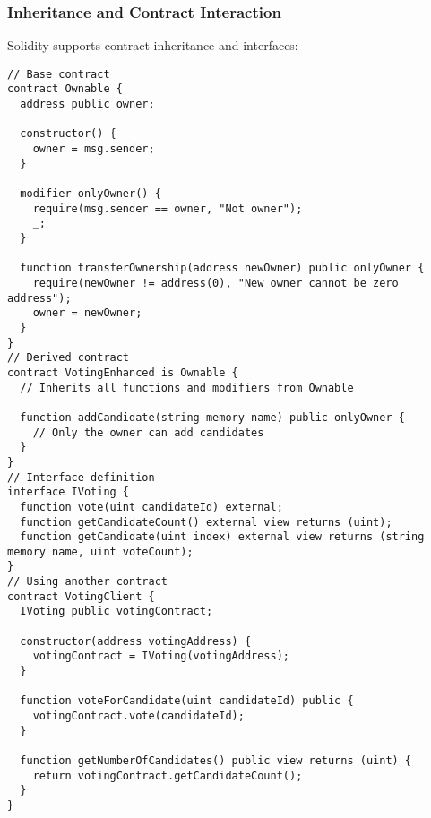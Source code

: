 \documentclass[12pt]{article}
\begin{document}
\noindent
\begin{minipage}[c]{\textwidth}
\subsubsection*{Inheritance and Contract Interaction}
Solidity supports contract inheritance and interfaces:

\begin{lstlisting}[language=Solidity]
// Base contract
contract Ownable {
  address public owner;

  constructor() {
    owner = msg.sender;
  }

  modifier onlyOwner() {
    require(msg.sender == owner, "Not owner");
    _;
  }

  function transferOwnership(address newOwner) public onlyOwner {
    require(newOwner != address(0), "New owner cannot be zero address");
    owner = newOwner;
  }
}
// Derived contract
contract VotingEnhanced is Ownable {
  // Inherits all functions and modifiers from Ownable
  
  function addCandidate(string memory name) public onlyOwner {
    // Only the owner can add candidates
  }
}
// Interface definition
interface IVoting {
  function vote(uint candidateId) external;
  function getCandidateCount() external view returns (uint);
  function getCandidate(uint index) external view returns (string memory name, uint voteCount);
}
// Using another contract
contract VotingClient {
  IVoting public votingContract;
  
  constructor(address votingAddress) {
    votingContract = IVoting(votingAddress);
  }

  function voteForCandidate(uint candidateId) public {
    votingContract.vote(candidateId);
  }

  function getNumberOfCandidates() public view returns (uint) {
    return votingContract.getCandidateCount();
  }
}
\end{lstlisting}
\end{minipage}
\end{document}
